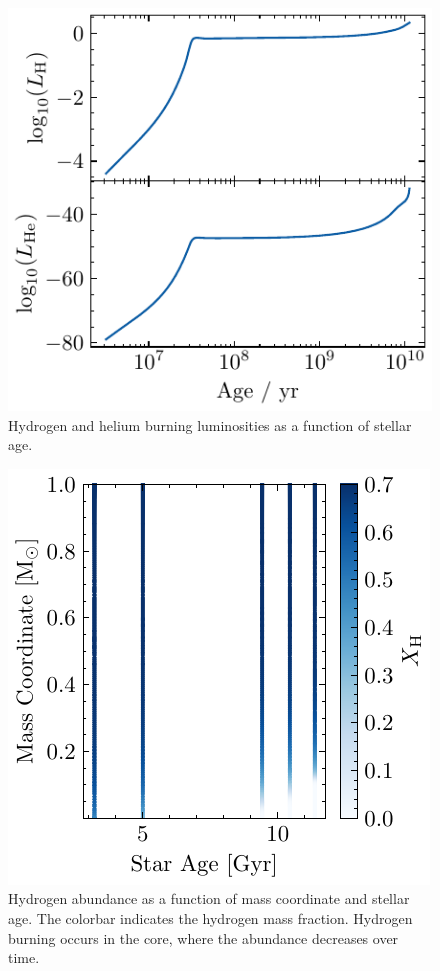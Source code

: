 \documentclass[twocolumn,fontsize=11pt]{scrartcl}
\begin{document}
\begin{figure}[htbp]
    \centering
    \includegraphics{q14_luminosity.pdf}
    \caption{Hydrogen and helium burning luminosities as a function of stellar age.}
    \label{fig:q14_luminosity}
\end{figure}
\begin{figure}[htbp]
    \centering
    \includegraphics{q14_abundancy_H.pdf}
    \caption{Hydrogen abundance as a function of mass coordinate and stellar age. The colorbar indicates the hydrogen mass fraction. Hydrogen burning occurs in the core, where the abundance decreases over time.}
    \label{fig:q14_abundancy_H}
\end{figure}
\end{document}

